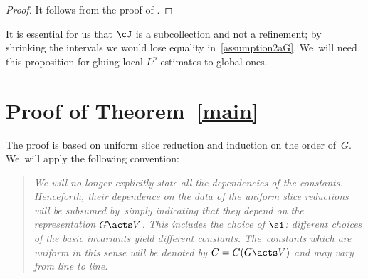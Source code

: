 \begin{proof}
 It follows from the proof of \cite[Proposition 2]{ParusinskiRainer15}.
\end{proof}


\begin{Remark} \label{rem:cover}
 It is essential for us that $\cJ$ is a subcollection and not a refinement; by shrinking the intervals we would
 lose equality in~\eqref{assumption2aG}. We~will need this proposition for gluing local $L^p$-estimates to global ones.
\end{Remark}





\section{Proof of \texorpdfstring{Theorem~\ref{main}}{Theorem 1.1}} \label{proof}

The proof is based on uniform slice reduction and induction on the order of~$G$. We~will apply the following convention:
\begin{quote}
 \it We will no longer explicitly state all the dependencies of the constants. Henceforth, their dependence on the
 data of the uniform slice reductions will be subsumed by~simply indicating that they depend on the representation
 $G \acts V$. This includes the choice of $\si$: different choices of the basic invariants yield different constants.
 The~constants which are uniform in this sense will be denoted by $C = C(G \acts V)$ and may vary from line to line.
\end{quote}



